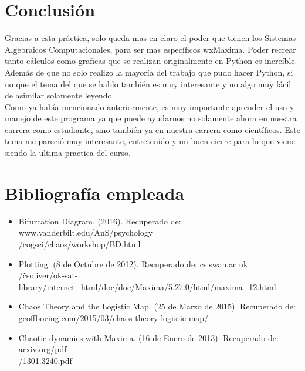 \documentclass[12pt]{article}
\begin{document}
\section{Conclusión}
Gracias a esta práctica, solo queda mas en claro el poder que tienen los Sistemas Algebraicos Computacionales, para ser mas específicos wxMaxima. Poder recrear tanto cálculos como graficas que se realizan originalmente en Python es increíble. Además de que no solo realizo la mayoría del trabajo que pudo hacer Python, si no que el tema del que se hablo también es muy interesante y no algo muy fácil de asimilar solamente leyendo. \\
 
Como ya había mencionado anteriormente, es muy importante aprender el uso y manejo de este programa ya que puede ayudarnos no solamente ahora en nuestra carrera como estudiante, sino también ya en nuestra carrera como científicos. Este tema me pareció muy interesante, entretenido y un buen cierre para lo que viene siendo la ultima practica del curso. 

\section{Bibliografía empleada}
\begin{itemize}
    \item Bifurcation Diagram. (2016). Recuperado de: www.vanderbilt.edu/AnS/psychology\\/cogsci/chaos/workshop/BD.html
    \item Plotting. (8 de Octubre de 2012). Recuperado de: cs.swan.ac.uk\\/\~csoliver/ok-sat-library/internet\_html/doc/doc/Maxima/5.27.0/html/maxima\_12.html
    \item Chaos Theory and the Logistic Map. (25 de Marzo de 2015). Recuperado de: geoffboeing.com/2015/03/chaos-theory-logistic-map/
    \item Chaotic dynamics with Maxima. (16 de Enero de 2013). Recuperado de: arxiv.org/pdf\\/1301.3240.pdf
\end{itemize}
\end{document}

